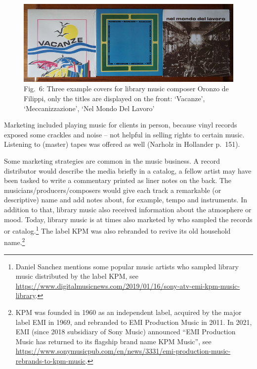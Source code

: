 \documentclass[a4paper,
fontsize=11pt,
oneside,
numbers=noperiodatend,
parskip=half-,
bibliography=totoc,
final
]{scrartcl}
\begin{document}
\begin{figure}
\centering
\includegraphics[width=1\textwidth]{img/Fig6.jpg}
\caption{Fig.~6: Three example covers for library music composer Oronzo de Filippi, only the titles are displayed on the front: \enquote*{Vacanze}, \enquote*{Meccanizzazione}, \enquote*{Nel Mondo Del Lavoro}}
\end{figure}

Marketing included playing music for clients in person, because vinyl
records exposed some crackles and noise -- not helpful in selling rights
to certain music. Listening to (master) tapes was offered as well
(Narholz in Hollander p.~151).

Some marketing strategies are common in the music business. A record
distributor would describe the media briefly in a catalog, a fellow
artist may have been tasked to write a commentary printed as liner notes
on the back. The musicians/producers/composers would give each track a
remarkable (or descriptive) name and add notes about, for example, tempo
and instruments. In addition to that, library music also received
information about the atmosphere or mood. Today, library music is at
times also marketed by who sampled the records or catalog.\footnote{Daniel
  Sanchez mentions some popular music artists who sampled library music
  distributed by the label KPM, see
  \url{https://www.digitalmusicnews.com/2019/01/16/sony-atv-emi-kpm-music-library}.}
The label KPM was also rebranded to revive its old household
name.\footnote{KPM was founded in 1960 as an independent label, acquired
  by the major label EMI in 1969, and rebranded to EMI Production Music
  in 2011. In 2021, EMI (since 2018 subsidiary of Sony Music) announced
  \enquote{EMI Production Music has returned to its flagship brand name
  KPM Music}, see
  \url{https://www.sonymusicpub.com/en/news/3331/emi-production-music-rebrands-to-kpm-music}.}
\end{document}
